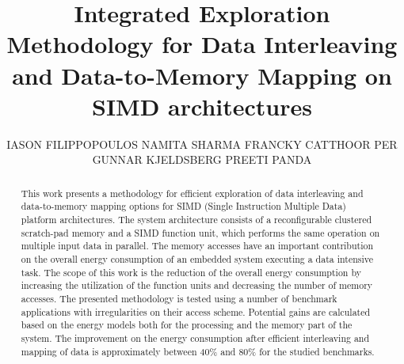 \documentclass[prodmode,acmtodaes]{acmsmall}
\begin{document}

\title{Integrated Exploration Methodology for Data Interleaving and Data-to-Memory Mapping on SIMD architectures}
\author{IASON FILIPPOPOULOS
NAMITA SHARMA 
FRANCKY CATTHOOR
PER GUNNAR KJELDSBERG
PREETI PANDA
}

\begin{abstract}
This work presents a methodology for efficient exploration of data interleaving and data-to-memory mapping options for SIMD (Single Instruction Multiple Data) platform architectures.
The system architecture consists of  a reconfigurable clustered scratch-pad memory and a SIMD function unit, which performs the same operation on multiple input data in parallel. 
The memory accesses have an important contribution on the overall energy consumption of an embedded system executing a data intensive task. 
The scope of this work is the reduction of the overall energy consumption by increasing the utilization of the function units and decreasing the number of memory accesses.
The presented methodology is tested using a number of benchmark applications with irregularities on their access scheme.
Potential gains are calculated based on the energy models both for the processing and the memory part of the system.
The improvement on the energy consumption after efficient interleaving and mapping of data is approximately between 40\% and 80\% for the studied benchmarks.
\end{abstract}




\end{document}
